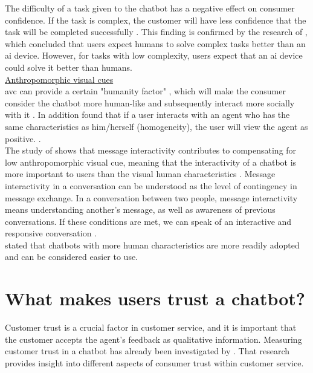 The difficulty of a task given to the chatbot has a negative effect on consumer confidence. If the task is complex, the customer will have less confidence that the task will be completed successfully \citep{Cheng2021}.
This finding is confirmed by the research of \citeauthor{XU2020}, which concluded that users expect humans to solve complex tasks better than an \acrshort{ai} device. However, for tasks with low complexity, users expect that an \acrshort{ai} device could solve it better than humans. \citep{XU2020}\\
\break
\ul{Anthropomorphic visual cues}\\
\gls{avc} can provide a certain "humanity factor" \citep{Shyam2008}, which will make the consumer consider the chatbot more human-like and subsequently interact more socially with it \citep*{Go2019,Gong2007,Kim2012, Nowak2004}.
In addition \citeauthor{Go2019,Koda1996,Wexelblat1998} found that if a user interacts with an agent who has the same characteristics as him/herself (homogeneity), the user will view the agent as positive. \citep*{Go2019,Koda1996,Wexelblat1998}.\\
\break
The study of \citeauthor{Go2019} shows that message interactivity contributes to compensating for low anthropomorphic visual cue, meaning that the interactivity of a chatbot is more important to users than the visual human characteristics \citep{Go2019}. Message interactivity in a conversation can be understood as the level of contingency in message exchange. In a conversation between two people, message interactivity means understanding another's message, as well as awareness of previous conversations. If these conditions are met, we can speak of an interactive and responsive conversation \citep*{Go2019,Sudweeks1998}.\\
\citeauthor{Sheehan2020} stated that chatbots with more human characteristics are more readily adopted and can be considered easier to use. \citep{Sheehan2020}

\section{What makes users trust a chatbot?}
Customer trust is a crucial factor in customer service, and it is important that the customer accepts the agent's feedback as qualitative information. Measuring customer trust in a chatbot has already been investigated by \citeauthor{Folstad2018}. That research provides insight into different aspects of consumer trust within customer service.

